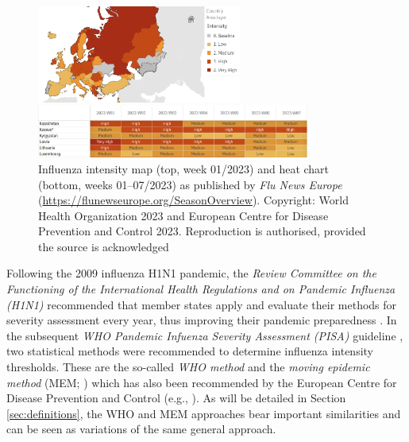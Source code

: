 \documentclass{article}
\begin{document}
\begin{figure}[h!]
\begin{center}
\includegraphics[width=0.6\textwidth]{figure/maps.png}

\medskip

\includegraphics[width=0.8\textwidth]{figure/heat_chart.png}
\end{center}
\caption{Influenza intensity map (top, week 01/2023) and heat chart (bottom, weeks 01--07/2023) as published by \textit{Flu News Europe} (\url{https://flunewseurope.org/SeasonOverview}). Copyright: World Health Organization 2023 and European Centre for Disease Prevention and Control 2023.
Reproduction is authorised, provided the source is acknowledged}
\label{fig:maps}
\end{figure}

Following the 2009 influenza H1N1 pandemic, the \textit{Review Committee on the Functioning of the International Health Regulations and on Pandemic Influenza (H1N1)} recommended that member states apply and evaluate their methods for severity assessment every year, thus improving their pandemic preparedness \citep[p.118]{WHO2011}. In the subsequent \textit{WHO Pandemic Infuenza Severity Assessment (PISA)} guideline \citep{WHO2017}, two statistical methods were recommended to determine influenza intensity thresholds. These are the so-called \textit{WHO method} \citep{WHO2014} and the \textit{moving epidemic method} (MEM; \citealt{Vega2015}) which has also been recommended by the European Centre for Disease Prevention and Control (e.g., \citealt{ECDC2017}). As will be detailed in Section \ref{sec:definitions}, the WHO and MEM approaches bear important similarities and can be seen as variations of the same general approach.
\end{document}
